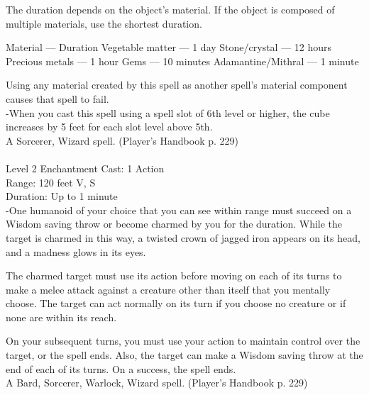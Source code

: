 \documentclass[10pt,twocolumn]{report}
\begin{document}
The duration depends on the object’s material. If the object is composed of multiple materials, use the shortest duration. 

Material — Duration 
Vegetable matter — 1 day 
Stone/crystal — 12 hours 
Precious metals — 1 hour 
Gems — 10 minutes 
Adamantine/Mithral — 1 minute 

Using any material created by this spell as another spell’s material component causes that spell to fail.\\
-When you cast this spell using a spell slot of 6th level or higher, the cube increases by 5 feet for each slot level above 5th.\\
A Sorcerer, Wizard spell. (Player's Handbook p. 229) \\


 \\
Level 2 \quad Enchantment \quad Cast: 1 Action\\
Range: 120 feet \quad V, S\\
Duration: Up to 1 minute \quad \\
-One humanoid of your choice that you can see within range must succeed on a Wisdom saving throw or become charmed by you for the duration. 
While the target is charmed in this way, a twisted crown of jagged iron appears on its head, and a madness glows in its eyes. 

The charmed target must use its action before moving on each of its turns to make a melee attack against a creature other than itself that you mentally choose. The target can act normally on its turn if you choose no creature or if none are within its reach. 

On your subsequent turns, you must use your action to maintain control over the target, or the spell ends. Also, the target can make a Wisdom saving throw at the end of each of its turns. On a success, the spell ends.\\
A Bard, Sorcerer, Warlock, Wizard spell. (Player's Handbook p. 229) \\
\end{document}
